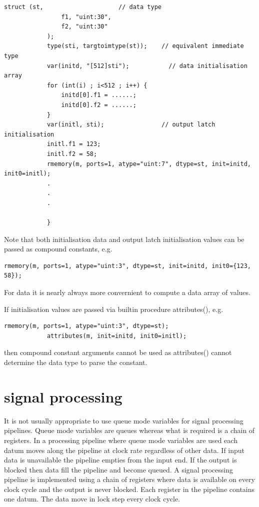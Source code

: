         \begin{lstlisting}[gobble=8, language=threepl]
            struct (st,                     // data type
                f1, "uint:30",
                f2, "uint:30"
            );
            type(sti, targtoimtype(st));    // equivalent immediate type
            var(initd, "[512]sti");           // data initialisation array
            for (int(i) ; i<512 ; i++) {
                initd[0].f1 = ......;
                initd[0].f2 = ......;
            }
            var(initl, sti);                // output latch initialisation
            initl.f1 = 123;
            initl.f2 = 58;
            rmemory(m, ports=1, atype="uint:7", dtype=st, init=initd, init0=initl);
            .
            .
            .
            
            }
        \end{lstlisting}
        
        Note that both initialisation data and output latch initialisation
        values can be passed as compound constants, e.g.
        \begin{lstlisting}[gobble=8, language=threepl]
            rmemory(m, ports=1, atype="uint:3", dtype=st, init=initd, init0={123, 58});
        \end{lstlisting}
        For data it is nearly always more convernient to compute a data array of
        values.
        
        If initialisation values are passed via builtin procedure
        attributes(), e.g.
        \begin{lstlisting}[gobble=8, language=threepl]
            rmemory(m, ports=1, atype="uint:3", dtype=st);
            attributes(m, init=initd, init0=initl);
        \end{lstlisting}
        
        then compound constant arguments cannot be used as attributes() cannot
        determine the data type to parse the constant.


    \section{signal processing}\label{sec:dsp}
    
        It is not usually appropriate to use queue mode variables for
        signal processing pipelines. Queue mode variables are queues
        whereas what is required is a chain of registers. In a processing
        pipeline where queue mode variables are used each datum moves along
        the pipeline at clock rate regardless of other data. If input
        data is unavailable the pipeline empties from the input end.
        If the output is blocked then data fill the pipeline and become
        queued. A signal processing pipeline is implemented using a chain
        of registers where data is available on every clock cycle and the
        output is never blocked. Each register in the pipeline contains one
        datum. The data move in lock step every clock cycle.

